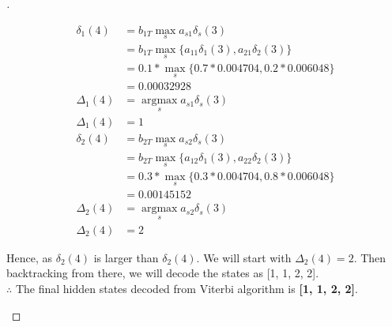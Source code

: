 \documentclass[a4paper, 12pt]{article}
\DeclareMathOperator*{\argmax}{argmax}
\DeclareMathOperator*{\max}{max}
\begin{document}
\begin{proof}[]
\begin{enumerate}[label={\color{blue}{\textbf{3.\arabic*})}}]
        \begin{align*}
            \delta_{1}(4) &= b_{1T}\max\limits_sa_{s1}\delta_{s}(3)\\
            &= b_{1T}\max\limits_s \{ a_{11}\delta_{1}(3), a_{21}\delta_{2}(3) \}\\
            &= 0.1*\max\limits_s \{ 0.7*0.004704, 0.2*0.006048 \}\\
            &= 0.00032928\\
            \Delta_{1}(4) &= \argmax\limits_sa_{s1}\delta_{s}(3)\\
            \Delta_{1}(4) &= 1\\
            \delta_{2}(4) &= b_{2T}\max\limits_sa_{s2}\delta_{s}(3)\\
            &= b_{2T}\max\limits_s \{ a_{12}\delta_{1}(3), a_{22}\delta_{2}(3) \}\\
            &= 0.3*\max\limits_s \{ 0.3*0.004704, 0.8*0.006048 \}\\
            &= 0.00145152\\
            \Delta_{2}(4) &= \argmax\limits_sa_{s2}\delta_{s}(3)\\
            \Delta_{2}(4) &= 2
        \end{align*}
        
        Hence, as $\delta_{2}(4)$ is larger than $\delta_{2}(4)$. We will start with $\Delta_{2}(4) = 2$. Then backtracking from there, we will decode the states as [1, 1, 2, 2]. \\
        $\therefore$ The final hidden states decoded from Viterbi algorithm is \textbf{[1, 1, 2, 2]}.
        

\end{enumerate}
\end{proof}
\end{document}
